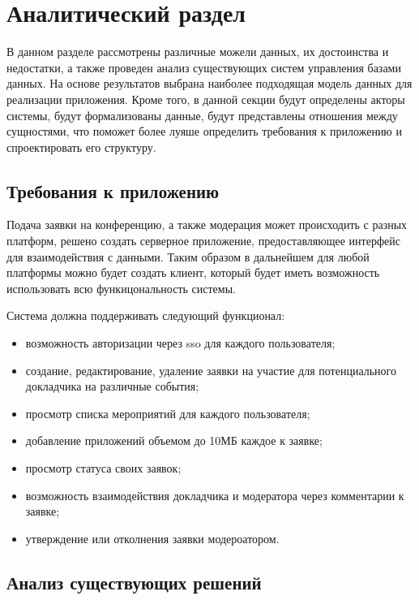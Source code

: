 \section{Аналитический раздел} \label{analysis}


В данном разделе рассмотрены различные можели данных, их достоинства и недостатки, а также проведен анализ существующих систем управления базами данных. На основе результатов выбрана наиболее подходящая модель данных для реализации приложения. Кроме того, в данной секции будут определены акторы системы, будут формализованы данные, будут представлены отношения между сущностями, что поможет более луяше определить требования к приложению и спроектировать его структуру.

\subsection{Требования к приложению}

Подача заявки на конференцию, а также модерация может происходить с разных платформ, решено создать серверное приложение, предоставляющее интерфейс для взаимодействия с данными.  Таким образом в дальнейшем для любой платформы можно будет создать клиент, который будет иметь возможность использовать всю функицональность системы.

Система должна поддерживать следующий функционал:
\begin{itemize}[label=---]
		\item возможность авторизации через sso\cite{sso} для каждого пользователя;
		\item создание, редактирование, удаление заявки на участие для потенциального докладчика на различные события;
		\item просмотр списка мероприятий для каждого пользователя;
		\item добавление приложений объемом до 10МБ каждое к заявке;
		\item просмотр статуса своих заявок;
		\item возможность взаимодействия докладчика и модератора через комментарии к заявке;
		\item утверждение или отколнения заявки модероатором.
\end{itemize}

\subsection{Анализ существующих решений}

